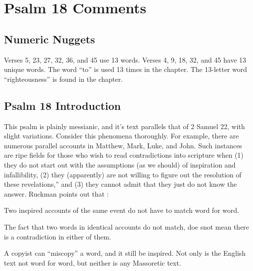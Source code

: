 \section{Psalm 18 Comments}

\subsection{Numeric Nuggets}
Verses 5, 23, 27, 32, 36, and 45 use 13 words. Verses 4, 9, 18, 32, and 45 have 13 unique words. The word ``to'' is used 13 times in the chapter. The 13-letter word ``righteousness'' is found in the chapter.

\subsection{Psalm 18 Introduction}
This psalm is plainly messianic, and it's text parallels that of 2 Samuel 22, with slight variations. Consider this phenomena thoroughly. For example, there are numerous parallel accounts in Matthew, Mark, Luke, and John. Such instances are ripe fields for those who wish to read contradictions into scripture when (1) they do not start out with the assumptions (as we should) of inspiration and infallibility, (2) they (apparently) are not willing to figure out the resolution of these revelations,'' and (3) they cannot admit that they just do not know the answer. Ruckman points out that \cite{Ruckman1992PsalmsV1}:
\begin{compactenum}
    \item Two inspired accounts of the same event do not have to match word for word.
    \item The fact that two words in identical accounts do not match, doe snot mean there is a contradiction in either of them.
    \item A copyist can ``miscopy'' a word, and it still be inspired. Not only is the English text not word for word, but neither is any Massoretic text.
\end{compactenum}

